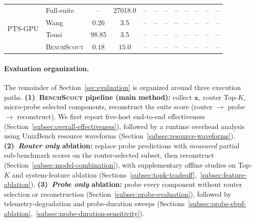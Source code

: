\documentclass[sigplan,10pt]{acmart}
\newcommand{\ourmethod}{\textsc{BenchScout}\xspace}
\newcommand{\ptsgpu}{PTS-GPU}
\begin{document}
\begin{table}[t]
\begin{tabular}{llcccccccccc}
\midrule

\multirow{4}{*}{\ptsgpu} 
& Full-suite & -- & 27018.0 & -- & -- & -- & -- & -- & -- & -- & -- \\
& Wang~\cite{wang2019predicting} & 0.26 & 3.5 & -- & -- & -- & -- & -- & -- & -- & -- \\
& Tousi~\cite{tousi2022comparative} & 98.85 & 3.5 & -- & -- & -- & -- & -- & -- & -- & -- \\
& \ourmethod & $\mathbf{0.18}$ & $\mathbf{15.0}$ & -- & -- & -- & -- & -- & -- & -- & -- \\

\bottomrule
\end{tabular}
\end{table}


\paragraph{Evaluation organization.}
The remainder of Section~\ref{sec:evaluation} is organized around three execution paths.
\textbf{(1)~\ourmethod{} pipeline (main method):}
collect $\mathbf{x}$, router Top-$K$, micro-probe selected components, reconstruct the suite score (router $\rightarrow$ probe $\rightarrow$ reconstruct).
We first report five-host end-to-end effectiveness (Section~\ref{subsec:overall-effectiveness}), followed by a runtime overhead analysis using UnixBench resource waveforms (Section~\ref{subsec:resource-waveforms}).
\textbf{(2)~\emph{Router only} ablation:}
replace probe predictions with \emph{measured} partial sub-benchmark scores on the router-selected subset, then reconstruct (Section~\ref{subsec:model-combination}), with supplementary offline studies on Top-$K$ and system-feature ablation (Sections~\ref{subsec:topk-tradeoff},~\ref{subsec:feature-ablation}).
\textbf{(3)~\emph{Probe only} ablation:}
probe every component without router selection or reconstruction (Section~\ref{subsec:probe-evaluation}), followed by telemetry-degradation and probe-duration sweeps (Sections~\ref{subsec:probe-ebpf-ablation},~\ref{subsec:probe-duration-sensitivity}).
\end{document}
